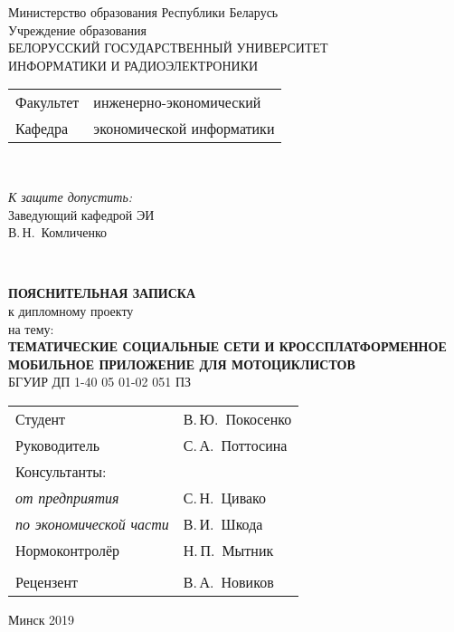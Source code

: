 \begin{titlepage}
  \begin{center}
    Министерство образования Республики Беларусь\\[1em]
    Учреждение образования\\
    БЕЛОРУССКИЙ ГОСУДАРСТВЕННЫЙ УНИВЕРСИТЕТ \\
    ИНФОРМАТИКИ И РАДИОЭЛЕКТРОНИКИ\\[1em]

    \begin{minipage}{\textwidth}
      \begin{flushleft}
        \begin{tabular}{ l l }
          Факультет & инженерно-экономический\\
          Кафедра   & экономической информатики
        \end{tabular}
      \end{flushleft}
    \end{minipage}\\[1em]

    \begin{flushright}
      \begin{minipage}{0.4\textwidth}
        \textit{К защите допустить:}\\[0.8em]
        Заведующий кафедрой ЭИ\\[0.45em]
        \underline{\hspace*{2.6cm}} В.\,Н.~Комличенко
      \end{minipage}\\[2.2em]
    \end{flushright}

    \textbf{ПОЯСНИТЕЛЬНАЯ ЗАПИСКА}\\
    {к дипломному проекту}\\
    {на тему:}\\[1em]
    \textbf{ТЕМАТИЧЕСКИЕ СОЦИАЛЬНЫЕ СЕТИ И КРОССПЛАТФОРМЕННОЕ МОБИЛЬНОЕ ПРИЛОЖЕНИЕ ДЛЯ МОТОЦИКЛИСТОВ}\\[1em]


    {БГУИР ДП 1-40 05 01-02 051 ПЗ}\\[2em]
    
    \begin{tabular}{ p{}p{} }
      Студент & В.\,Ю.~Покосенко \\
      Руководитель & С.\,А.~Поттосина \\
      Консультанты: &\\
      \hspace*{3ex}\emph{от предприятия} & С.\,Н.~Цивако \\
      \hspace*{3ex}\emph{по экономической части} & В.\,И.~Шкода \\
      Нормоконтролёр & Н.\,П.~Мытник\\
      & \\
      Рецензент & В.\,А.~Новиков 
    \end{tabular}
    
    \vfill
    {\normalsize Минск 2019}
  \end{center}
\end{titlepage}

